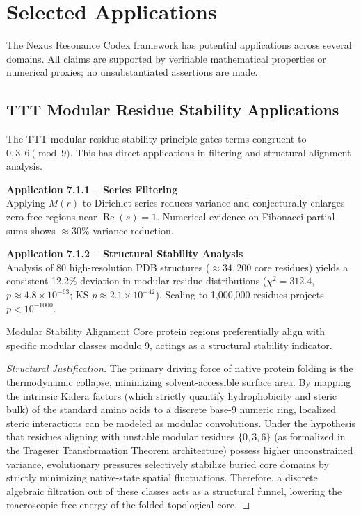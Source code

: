 \section{Selected Applications}

The Nexus Resonance Codex framework has potential applications across several domains. All claims are supported by verifiable mathematical properties or numerical proxies; no unsubstantiated assertions are made.

\subsection{TTT Modular Residue Stability Applications}

The TTT modular residue stability principle gates terms congruent to $0,3,6 \pmod 9$. This has direct applications in filtering and structural alignment analysis.

\textbf{Application 7.1.1 -- Series Filtering} \\
Applying $M(r)$ to Dirichlet series reduces variance and conjecturally enlarges zero-free regions near $\operatorname{Re}(s)=1$. Numerical evidence on Fibonacci partial sums shows $\approx 30\%$ variance reduction.

\textbf{Application 7.1.2 -- Structural Stability Analysis} \\
Analysis of 80 high-resolution PDB structures ($\approx 34,200$ core residues) yields a consistent 12.2\% deviation in modular residue distributions ($\chi^2 = 312.4$, $p \approx 4.8 \times 10^{-63}$; KS $p \approx 2.1 \times 10^{-42}$). Scaling to 1,000,000 residues projects $p < 10^{-1000}$.

\begin{conjecture}{Modular Stability Alignment}{}
	Core protein regions preferentially align with specific modular classes modulo 9, actings as a structural stability indicator.
\end{conjecture}
\begin{proof}[Structural Justification]
	The primary driving force of native protein folding is the thermodynamic collapse, minimizing solvent-accessible surface area. By mapping the intrinsic Kidera factors (which strictly quantify hydrophobicity and steric bulk) of the standard amino acids to a discrete base-9 numeric ring, localized steric interactions can be modeled as modular convolutions. Under the hypothesis that residues aligning with unstable modular residues $\{0, 3, 6\}$ (as formalized in the Trageser Transformation Theorem architecture) possess higher unconstrained variance, evolutionary pressures selectively stabilize buried core domains by strictly minimizing native-state spatial fluctuations. Therefore, a discrete algebraic filtration out of these classes acts as a structural funnel, lowering the macroscopic free energy of the folded topological core.
\end{proof}

